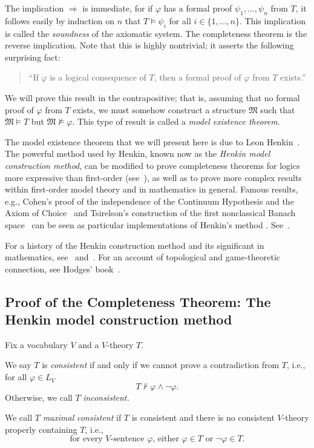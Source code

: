 \documentclass{scrartcl}
\renewcommand{\phi}{\varphi}
\newcommand{\FM}{\mathfrak{M}}
\begin{document}
The implication $\Rightarrow$ is immediate, for if $\phi$ has a formal proof $\psi_1,\dots, \psi_n$ from $T$, it follows easily by induction on $n$ that  $T\models \psi_i$ for all $i\in\{1,\dots, n\}$. This implication is called the \emph{soundness} of the axiomatic system. The completeness theorem is the reverse implication. Note that this is highly nontrivial; it asserts the following surprising fact:
\begin{quote}
``If $\phi$ is a logical consequence of $T$, then a formal proof of $\phi$ from $T$ exists.''
\end{quote}

We will prove this result in the contrapositive; that is, assuming that no formal proof of $\phi$ from $T$ exists, we must somehow construct a structure $\FM$ such that $\FM\models T$ but $\FM\not\models \phi$.  This type of result is called a \emph{model existence theorem}. 

\begin{history}
The model existence theorem that we will present here is due to Leon Henkin~\cite{Henkin:1949}. The powerful method used by Henkin, known now as the \emph{Henkin model construction method}, can be modified to prove completeness theorems for logics more expressive than first-order (see~\cite{Henkin:1950,Keisler:1971,Hodges:1985}), as well as to prove more complex results within first-order model theory and in mathematics in general. Famous results, e.g., Cohen's proof of the independence of the Continuum Hypothesis and the Axiom of Choice~\cite{Cohen:1963,Cohen:1966} and Tsirelson's construction of the first nonclassical Banach space~\cite{Tsirelson:1974} can be seen as particular implementations of Henkin's method . See~\cite{Henkin:1996,Leblanc-Roeper:1991,Baldwin:2018}.

For a history of the Henkin construction method and its significant in mathematics, see~\cite{Henkin:1996} and~\cite{Baldwin:2018}. For an account of topological and game-theoretic connection, see Hodges' book~\cite{Hodges:1985}.
\end{history}

\subsection{Proof of the Completeness Theorem: The Henkin model construction method}
\label{S:Henkin construction}

Fix a vocabulary $V$ and a $V$-theory $T$.

\begin{definition}
We say $T$ is \emph{consistent} if and only if we cannot prove a contradiction from $T$, i.e., for all $\phi\in L_V$ \[ T\not\vdash \phi\wedge\neg\phi\text{.}
\]
Otherwise, we call $T$ \emph{inconsistent.}

We call $T$ \emph{maximal consistent} if $T$ is consistent and there is no consistent $V$-theory properly containing $T$, i.e., 
\[
\text{for every $V$-sentence $\phi$, either $\phi\in T$ or $\neg\phi\in T$.}
\]
\end{definition}
\end{document}
